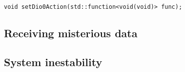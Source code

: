 \begin{lstlisting}[firstnumber=687, caption=Fragment of the PR that would have allowed RadioLib to accept member functions on ISR setup. The rest of the PR touches some internals of the library. This code section belongs to SX127x.cpp, label=lst:RadioLibPR,captionpos=b]
void setDio0Action(std::function<void(void)> func);
\end{lstlisting}

\subsection{Receiving misterious data}
\subsection{System inestability}
